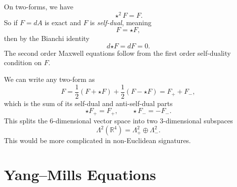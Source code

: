 \begin{example}[self-duality, $n = 4, t = 0$]
  On two-forms, we have
  \begin{equation}
    {\star^2 F} = F.
  \end{equation}
  So if $F = dA$ is exact and $F$ is \emph{self-dual}, meaning
  \begin{equation}
    \boxed{F = \star F},
  \end{equation}
  then by the Bianchi identity
  \begin{equation}
    d {\star F} = d F = 0.
  \end{equation}
  The second order Maxwell equations follow from the first order self-duality condition on $F$.
  \begin{remark}
    We can write any two-form as
    \begin{equation}
      F = \frac{1}{2} (F + \star F) + \frac{1}{2} (F - \star F) = F_+ + F_-,
    \end{equation}
    which is the sum of its self-dual and anti-self-dual parts
    \begin{equation}
      {\star F}_+ = F_+, \qquad \star F_- = - F_-.
    \end{equation}
    This splits the $6$-dimensional vector space into two $3$-dimensional subspaces
    \begin{equation}
      \Lambda^2 (\mathbb{R}^4) = \Lambda_+^2 \oplus \Lambda_-^2.
    \end{equation}
    This would be more complicated in non-Euclidean signatures.
  \end{remark}
\end{example}

\section{Yang--Mills Equations}%
\label{sec:yang_mills_equations}

